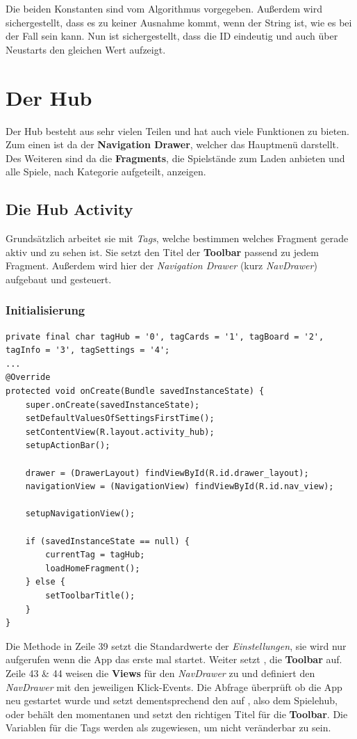 Die beiden Konstanten sind vom Algorithmus vorgegeben. Außerdem wird
sichergestellt, dass es zu keiner Ausnahme kommt, wenn der String 
ist, wie es bei  der Fall sein kann. Nun ist sichergestellt, dass die
ID eindeutig und auch über Neustarts den gleichen Wert aufzeigt.

\section{Der Hub}
\sectionauthor{\leonard}

Der Hub besteht aus sehr vielen Teilen und hat auch viele Funktionen zu bieten.
Zum einen ist da der \textbf{Navigation Drawer}, welcher das Hauptmenü
darstellt. Des Weiteren sind da die \textbf{Fragments}, die Spielstände zum
Laden anbieten und alle Spiele, nach Kategorie aufgeteilt, anzeigen.

\subsection{Die Hub Activity}

Grundsätzlich arbeitet sie mit \emph{Tags}, welche bestimmen welches Fragment
gerade aktiv und zu sehen ist. Sie setzt den Titel der \textbf{Toolbar} passend
zu jedem Fragment. Außerdem wird hier der \emph{Navigation Drawer}
(kurz \emph{NavDrawer}) aufgebaut und gesteuert.

\subsubsection{Initialisierung}

\begin{lstlisting}[caption={Hub onCreate() Methode},captionpos=b]
private final char tagHub = '0', tagCards = '1', tagBoard = '2', tagInfo = '3', tagSettings = '4';
...
@Override
protected void onCreate(Bundle savedInstanceState) {
	super.onCreate(savedInstanceState);
	setDefaultValuesOfSettingsFirstTime();
	setContentView(R.layout.activity_hub);
	setupActionBar();

	drawer = (DrawerLayout) findViewById(R.id.drawer_layout);
	navigationView = (NavigationView) findViewById(R.id.nav_view);

	setupNavigationView();

	if (savedInstanceState == null) {
		currentTag = tagHub;
		loadHomeFragment();
	} else {
		setToolbarTitle();
	}
}
\end{lstlisting}

Die Methode in Zeile 39 setzt die Standardwerte der \emph{Einstellungen}, sie
wird nur aufgerufen wenn die App das erste mal startet. Weiter setzt
, die \textbf{Toolbar} auf. Zeile 43 \& 44 weisen die
\textbf{Views} für den \emph{NavDrawer} zu und 
definiert den \emph{NavDrawer} mit den jeweiligen Klick-Events. Die
 Abfrage überprüft ob die App neu gestartet wurde und setzt
dementsprechend den  auf , also dem Spielehub,
oder behält den momentanen und setzt den richtigen Titel für die
\textbf{Toolbar}. Die Variablen für die Tags werden als 
zugewiesen, um nicht veränderbar zu sein.

